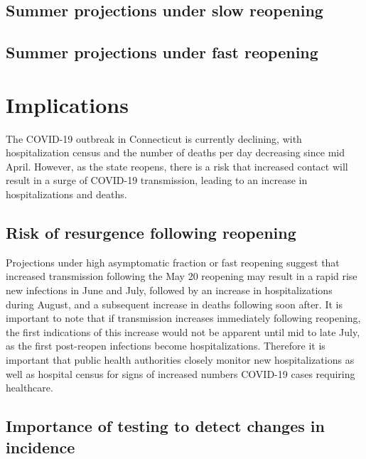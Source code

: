 \documentclass[11pt]{article}
\begin{document}
\subsection*{Summer projections under slow reopening} 






\subsection*{Summer projections under fast reopening} 






\section*{Implications}

The COVID-19 outbreak in Connecticut is currently declining, with hospitalization census and the number of deaths per day decreasing since mid April.  However, as the state reopens, there is a risk that increased contact will result in a surge of COVID-19 transmission, leading to an increase in hospitalizations and deaths.  


\subsection*{Risk of resurgence following reopening} 

Projections under high asymptomatic fraction or fast reopening suggest that increased transmission following the May 20 reopening may result in a rapid rise new infections in June and July, followed by an increase in hospitalizations during August, and a subsequent increase in deaths following soon after.  It is important to note that if transmission increases immediately following reopening, the first indications of this increase would not be apparent until mid to late July, as the first post-reopen infections become hospitalizations.  Therefore it is important that public health authorities closely monitor new hospitalizations as well as hospital census for signs of increased numbers COVID-19 cases requiring healthcare.   


\subsection*{Importance of testing to detect changes in incidence}
\end{document}
